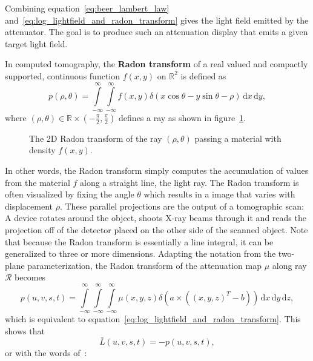 Combining equation~\ref{eq:beer_lambert_law} and~\ref{eq:log_lightfield_and_radon_transform} gives the light field emitted by the attenuator.
The goal is to produce such an attenuation display that emits a given target light field.

In computed tomography, the \textbf{Radon transform} of a real valued and compactly supported, continuous function $f(x, y)$ on $\mathbb{R}^2$ is defined as
\begin{equation}
	p(\rho, \theta) = 	
	\int \limits_{-\infty}^{\infty} 
		\int \limits_{-\infty}^{\infty}
			f(x, y) \delta (x \cos \theta - y \sin \theta - \rho) \, 
		\mathrm{d}x \,
	\mathrm{d}y,
\end{equation}
where $(\rho, \theta) \in \mathbb{R} \times \left(- \frac{\pi}{2}, \frac{\pi}{2}\right)$ defines a ray as shown in figure~\ref{fig:radon_transform_2D_sketch}.
\begin{figure}[tb]
	\centering
	
	\caption[The Radon transform]
			{The 2D Radon transform of the ray $(\rho, \theta)$ passing a material with density $f(x, y)$.}
	\label{fig:radon_transform_2D_sketch}
\end{figure}
In other words, the Radon transform simply computes the accumulation of values from the material $f$ along a straight line, the light ray.
The Radon transform is often visualized by fixing the angle $\theta$ which results in a image that varies with displacement $\rho$.
These parallel projections are the output of a tomographic scan: A device rotates around the object, shoots X-ray beams through it and reads the projection off of the detector placed on the other side of the scanned object. 
Note that because the Radon transform is essentially a line integral, it can be generalized to three or more dimensions.
Adapting the notation from the two-plane parameterization, the Radon transform of the attenuation map $\mu$ along ray $\mathcal{R}$ becomes
\begin{equation}
	p(u, v, s, t) = 
	\int \limits_{-\infty}^{\infty} 
		\int \limits_{-\infty}^{\infty}
			\int \limits_{-\infty}^{\infty}
				\mu(x, y, z) \delta \left(a \times \left((x, y, z)^T - b\right) \right) \, 
			\mathrm{d}x \,
		\mathrm{d}y \,
	\mathrm{d}z, 
\end{equation}
which is equivalent to equation~\ref{eq:log_lightfield_and_radon_transform}.
This shows that
\begin{equation}\label{eq:log_light_field_negative_radon}
	\bar{L}(u, v, s, t) = -p(u, v, s, t), 
\end{equation}
or with the words of~\cite{WetzsteinTomo}: 

